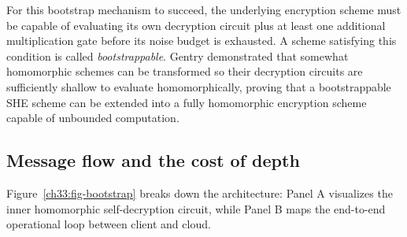 For this bootstrap mechanism to succeed, the underlying encryption scheme must be capable of evaluating its own decryption circuit plus at least one additional multiplication gate before its noise budget is exhausted. A scheme satisfying this condition is called \emph{bootstrappable}. Gentry demonstrated that somewhat homomorphic schemes can be transformed so their decryption circuits are sufficiently shallow to evaluate homomorphically, proving that a bootstrappable SHE scheme can be extended into a fully homomorphic encryption scheme capable of unbounded computation.

\subsection{Message flow and the cost of depth}
\label{ch33:flow}

Figure~\ref{ch33:fig-bootstrap} breaks down the architecture: Panel A visualizes the inner homomorphic self-decryption circuit, while Panel B maps the end-to-end operational loop between client and cloud.

